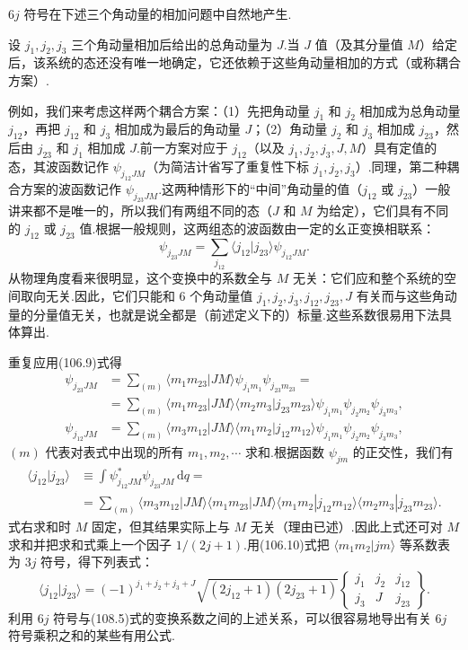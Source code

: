 $6j$ 符号在下述三个角动量的相加问题中自然地产生.

设 $j_1,j_2,j_3$ 三个角动量相加后给出的总角动量为 $J$.当 $J$ 值（及其分量值 $M$）给定后，该系统的态还没有唯一地确定，它还依赖于这些角动量相加的方式（或称耦合方案）.

例如，我们来考虑这样两个耦合方案：（1）先把角动量 $j_1$ 和 $j_2$ 相加成为总角动量 $j_{12}$，再把 $j_{12}$ 和 $j_3$ 相加成为最后的角动量 $J$；（2）角动量 $j_2$ 和 $j_3$ 相加成 $j_{23}$，然后由 $j_{23}$ 和 $j_1$ 相加成 $J$.前一方案对应于 $j_{12}$（以及 $j_1,j_2,j_3,J,M$）具有定值的态，其波函数记作 $\psi_{j_{12}JM}$（为简洁计省写了重复性下标 $j_1,j_2,j_3$）.同理，第二种耦合方案的波函数记作 $\psi_{j_{23}JM}$.这两种情形下的“中间”角动量的值（$j_{12}$ 或 $j_{23}$）一般讲来都不是唯一的，所以我们有两组不同的态（$J$ 和 $M$ 为给定），它们具有不同的 $j_{12}$ 或 $j_{23}$ 值.根据一般规则，这两组态的波函数由一定的幺正变换相联系：
\begin{equation}
  \psi_{j_{23}JM}=\sum_{j_{12}}\langle j_{12}|j_{23}\rangle\psi_{j_{12}JM}.
\end{equation}
从物理角度看来很明显，这个变换中的系数全与 $M$ 无关：它们应和整个系统的空间取向无关.因此，它们只能和 6 个角动量值 $j_1,j_2,j_3,j_{12},j_{23},J$ 有关而与这些角动量的分量值无关，也就是说全都是（前述定义下的）标量.这些系数很易用下法具体算出.

重复应用(106.9)式得
\begin{equation*}
\begin{aligned}
  \psi_{j_{23}JM}&=\sum_{(m)}\langle m_1m_{23}|JM\rangle
  \psi_{j_1m_1}\psi_{j_{23}m_{23}}=\\
  &=\sum_{(m)}\langle m_1m_{23}|JM\rangle
  \langle m_2m_3|j_{23}m_{23}\rangle
  \psi_{j_1m_1}\psi_{j_2m_2}\psi_{j_3m_3},\\
  \psi_{j_{12}JM}&=\sum_{(m)}\langle m_3m_{12}|JM\rangle
  \langle m_1m_2|j_{12}m_{12}\rangle
  \psi_{j_1m_1}\psi_{j_2m_2}\psi_{j_3m_3},
\end{aligned}
\end{equation*}
$(m)$ 代表对表式中出现的所有 $m_1,m_2,\cdots$ 求和.根据函数 $\psi_{jm}$ 的正交性，我们有
\begin{equation*}
\begin{aligned}
  \langle j_{12}|j_{23}\rangle&\equiv\int\psi^{*}_{j_{12}JM}
  \psi_{j_{23}JM}\,\mathrm{d}q=\\
  &=\sum_{(m)}\langle m_3m_{12}|JM\rangle
  \langle m_1m_{23}|JM\rangle
  \langle m_1m_2|j_{12}m_{12}\rangle
  \langle m_2m_3|j_{23}m_{23}\rangle.
\end{aligned}
\end{equation*}
式右求和时 $M$ 固定，但其结果实际上与 $M$ 无关（理由已述）.因此上式还可对 $M$ 求和并把求和式乘上一个因子 $1/(2j+1)$.用(106.10)式把 $\langle m_1m_2|jm\rangle$ 等系数表为 $3j$ 符号，得下列表式：
\begin{equation}
  \langle j_{12}|j_{23}\rangle=(-1)^{j_1+j_2+j_3+J}
  \sqrt{(2j_{12}+1)(2j_{23}+1)}
  \left\{\begin{array}{ccc}j_1&j_2&j_{12}\\j_3&J&j_{23}\end{array}\right\}.
\end{equation}
利用 $6j$ 符号与(108.5)式的变换系数之间的上述关系，可以很容易地导出有关 $6j$ 符号乘积之和的某些有用公式.


